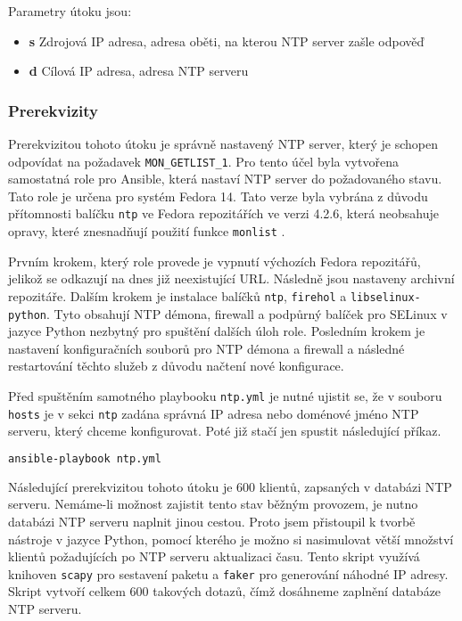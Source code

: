 \noindent Parametry útoku jsou:
\begin{itemize}
	\item \textbf{s} Zdrojová IP adresa, adresa oběti, na kterou NTP server zašle odpověď
	\item \textbf{d} Cílová IP adresa, adresa NTP serveru
\end{itemize}

\subsubsection{Prerekvizity}
Prerekvizitou tohoto útoku je správně nastavený NTP server, který je schopen odpovídat na požadavek \texttt{MON\_GETLIST\_1}. Pro tento účel byla vytvořena samostatná role pro Ansible, která nastaví NTP server do požadovaného stavu. Tato role je určena pro systém Fedora 14. Tato verze byla vybrána z důvodu přítomnosti balíčku \texttt{ntp} ve Fedora repozitářích ve verzi 4.2.6, která neobsahuje opravy, které znesnadňují použití funkce \texttt{monlist} \cite{ntpbug1532}.

Prvním krokem, který role provede je vypnutí výchozích Fedora repozitářů, jelikož se odkazují na dnes již neexistující URL. Následně jsou nastaveny archivní repozitáře. Dalším krokem je instalace balíčků \texttt{ntp}, \texttt{firehol} a \texttt{libselinux-python}. Tyto obsahují NTP démona, firewall a podpůrný balíček pro SELinux v jazyce Python nezbytný pro spuštění dalších úloh role. 
Posledním krokem je nastavení konfiguračních souborů pro NTP démona a firewall a následné restartování těchto služeb z důvodu načtení nové konfigurace.

Před spuštěním samotného playbooku \texttt{ntp.yml} je nutné ujistit se, že v souboru \texttt{hosts} je v sekci \texttt{ntp} zadána správná IP adresa nebo doménové jméno NTP serveru, který chceme konfigurovat. Poté již stačí jen spustit následující příkaz.

\begin{lstlisting}[language=bash]
ansible-playbook ntp.yml
\end{lstlisting}

Následující prerekvizitou tohoto útoku je 600 klientů, zapsaných v databázi NTP serveru. Nemáme-li možnost zajistit tento stav běžným provozem, je nutno databázi NTP serveru naplnit jinou cestou. Proto jsem přistoupil k tvorbě nástroje v jazyce Python, pomocí kterého je možno si nasimulovat větší množství klientů požadujících po NTP serveru aktualizaci času. Tento skript využívá knihoven \texttt{scapy} pro sestavení paketu a \texttt{faker} pro generování náhodné IP adresy. Skript vytvoří celkem 600 takových dotazů, čímž dosáhneme zaplnění databáze NTP serveru.


